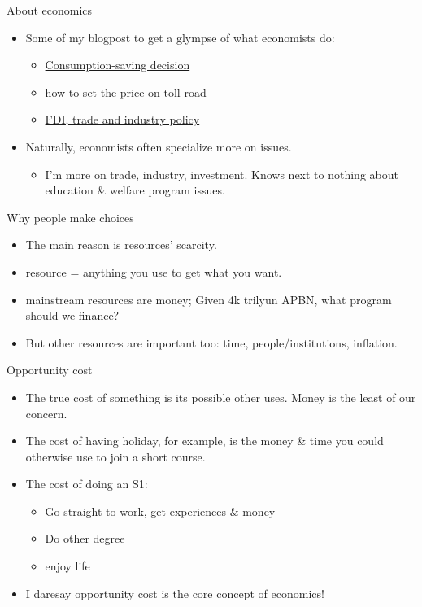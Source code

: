 \documentclass[
  ignorenonframetext,
]{beamer}
\providecommand{\tightlist}{%
  \setlength{\itemsep}{0pt}\setlength{\parskip}{0pt}}\usepackage{longtable,booktabs,array}
\begin{document}
\begin{frame}{About economics}
\protect\hypertarget{about-economics}{}
\begin{itemize}
\item
  Some of my blogpost to get a glympse of what economists do:

  \begin{itemize}
  \item
    \href{https://www.krisna.or.id/post/surga/}{Consumption-saving
    decision}
  \item
    \href{https://www.krisna.or.id/post/jorr/}{how to set the price on
    toll road}
  \item
    \href{https://www.krisna.or.id/post/hitektrade/}{FDI, trade and
    industry policy}
  \end{itemize}
\item
  Naturally, economists often specialize more on issues.

  \begin{itemize}
  \tightlist
  \item
    I'm more on trade, industry, investment. Knows next to nothing about
    education \& welfare program issues.
  \end{itemize}
\end{itemize}
\end{frame}

\begin{frame}{Why people make choices}
\protect\hypertarget{why-people-make-choices}{}
\begin{itemize}
\item
  The main reason is resources' scarcity.
\item
  resource = anything you use to get what you want.
\item
  mainstream resources are money; Given 4k trilyun APBN, what program
  should we finance?
\item
  But other resources are important too: time, people/institutions,
  inflation.
\end{itemize}
\end{frame}

\begin{frame}{Opportunity cost}
\protect\hypertarget{opportunity-cost}{}
\begin{itemize}
\item
  The true cost of something is its possible other uses. Money is the
  least of our concern.
\item
  The cost of having holiday, for example, is the money \& time you
  could otherwise use to join a short course.
\item
  The cost of doing an S1:

  \begin{itemize}
  \item
    Go straight to work, get experiences \& money
  \item
    Do other degree
  \item
    enjoy life
  \end{itemize}
\item
  I daresay opportunity cost is the core concept of economics!
\end{itemize}
\end{frame}
\end{document}
